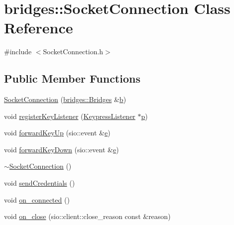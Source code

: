 \hypertarget{classbridges_1_1_socket_connection}{}\section{bridges\+:\+:Socket\+Connection Class Reference}
\label{classbridges_1_1_socket_connection}


{\ttfamily \#include $<$Socket\+Connection.\+h$>$}

\subsection*{Public Member Functions}
\begin{DoxyCompactItemize}
\item 
\hyperlink{classbridges_1_1_socket_connection_af8d4af3664ff3d4a2ca52aec5138b05b}{Socket\+Connection} (\hyperlink{classbridges_1_1_bridges}{bridges\+::\+Bridges} \&\hyperlink{namespacebridges_acfb0a4f7877d8f63de3e6862004c50eda92eb5ffee6ae2fec3ad71c777531578f}{b})
\item 
void \hyperlink{classbridges_1_1_socket_connection_a8e865500f57b141aa45b9e5b8fab909b}{register\+Key\+Listener} (\hyperlink{classbridges_1_1_keypress_listener}{Keypress\+Listener} $\ast$\hyperlink{namespacebridges_acfb0a4f7877d8f63de3e6862004c50eda83878c91171338902e0fe0fb97a8c47a}{p})
\item 
void \hyperlink{classbridges_1_1_socket_connection_a245d0bb4a1d2c69ffeaad1406d58ff06}{forward\+Key\+Up} (sio\+::event \&\hyperlink{namespacebridges_acfb0a4f7877d8f63de3e6862004c50edae1671797c52e15f763380b45e841ec32}{e})
\item 
void \hyperlink{classbridges_1_1_socket_connection_a82912828401deb66975d446f476488cc}{forward\+Key\+Down} (sio\+::event \&\hyperlink{namespacebridges_acfb0a4f7877d8f63de3e6862004c50edae1671797c52e15f763380b45e841ec32}{e})
\item 
\hyperlink{classbridges_1_1_socket_connection_aa5810b0c978315c18722e53f33622dfd}{$\sim$\+Socket\+Connection} ()
\item 
void \hyperlink{classbridges_1_1_socket_connection_ae981022aa8b3d4deb2853a7b61bd8f4a}{send\+Credentials} ()
\item 
void \hyperlink{classbridges_1_1_socket_connection_adb217448bb15c30691d0add6a7dcddad}{on\+\_\+connected} ()
\item 
void \hyperlink{classbridges_1_1_socket_connection_a4639457b75c15161950d789bcbb3cffc}{on\+\_\+close} (sio\+::client\+::close\+\_\+reason const \&reason)

\end{DoxyCompactItemize}
